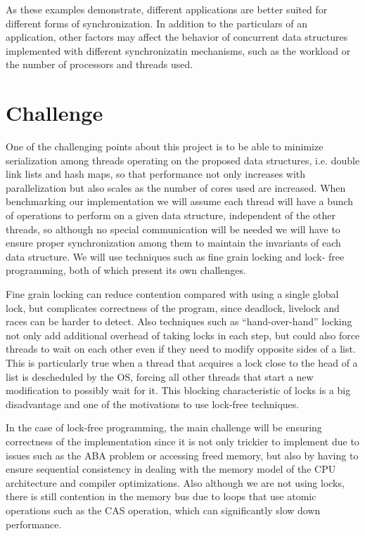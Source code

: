 \documentclass[11pt]{article}
\begin{document}
As these examples demonstrate, different applications are better suited for
different forms of synchronization. In addition to the particulars of an
application, other factors may affect the behavior of concurrent data structures
implemented with different synchronizatin mechanisms, such as the workload or
the number of processors and threads used.

\section*{Challenge} 
One of the challenging points about this project is to be
able to minimize serialization among threads operating on the proposed data
structures, i.e. double link lists and hash maps, so that performance not only
increases with parallelization but also scales as the number of cores used are
increased. When benchmarking our implementation we will assume each thread will
have a bunch of operations to perform on a given data structure, independent of
the other threads, so although no special communication will be needed we will
have to ensure proper synchronization among them to maintain the invariants of
each data structure. We will use techniques such as fine grain locking and lock-
free programming, both of which present its own challenges.

Fine grain locking can reduce contention compared with using a single global
lock, but complicates correctness of the program, since deadlock, livelock and
races can be harder to detect. Also techniques such as “hand-over-hand” locking
not only add additional overhead of taking locks in each step, but could also
force threads to wait on each other even if they need to modify opposite sides
of a list. This is particularly true when a thread that acquires a lock close to
the head of a list is descheduled by the OS, forcing all other threads that
start a new modification to possibly wait for it. This blocking characteristic
of locks is a big disadvantage and one of the motivations to use lock-free
techniques.

In the case of lock-free programming, the main challenge will be ensuring
correctness of the implementation since it is not only trickier to implement due
to issues such as the ABA problem or accessing freed memory, but also by having
to ensure sequential consistency in dealing with the memory model of the CPU
architecture and compiler optimizations. Also although we are not using locks,
there is still contention in the memory bus due to loops that use atomic
operations such as the CAS operation, which can significantly slow down
performance.
\end{document}
